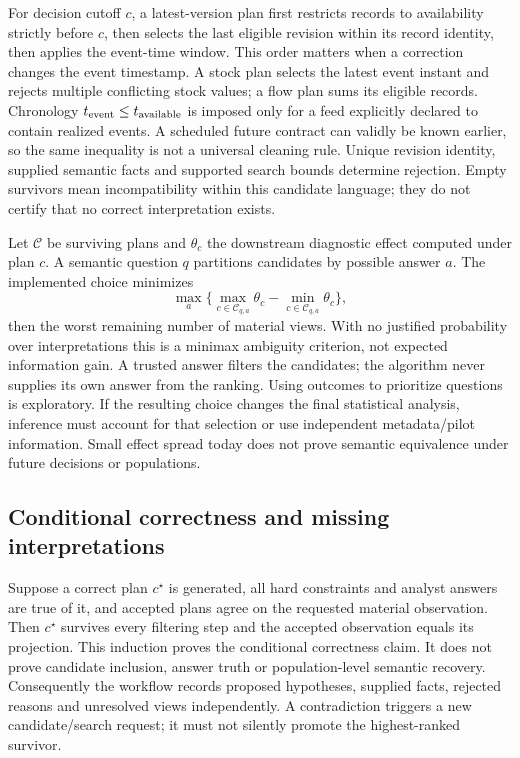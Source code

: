 For decision cutoff $c$, a latest-version plan first restricts records to
availability strictly before $c$, then selects the last eligible revision
within its record identity, then applies the event-time window. This order
matters when a correction changes the event timestamp. A stock plan selects
the latest event instant and rejects multiple conflicting stock values;
a flow plan sums its eligible records. Chronology
$t_{\rm event}\le t_{\rm available}$ is imposed only for a feed explicitly
declared to contain realized events. A scheduled future contract can validly
be known earlier, so the same inequality is not a universal cleaning rule.
Unique revision identity, supplied semantic facts and supported search bounds
determine rejection. Empty survivors mean incompatibility within this
candidate language; they do not certify that no correct interpretation exists.

Let $\mathcal C$ be surviving plans and $\theta_c$ the downstream diagnostic
effect computed under plan $c$. A semantic question $q$ partitions candidates
by possible answer $a$. The implemented choice minimizes
\[
 \max_a\{\max_{c\in\mathcal C_{q,a}}\theta_c-
                 \min_{c\in\mathcal C_{q,a}}\theta_c\},
\]
then the worst remaining number of material views. With no justified
probability over interpretations this is a minimax ambiguity criterion,
not expected information gain. A trusted answer filters the candidates;
the algorithm never supplies its own answer from the ranking. Using outcomes
to prioritize questions is exploratory. If the resulting choice changes
the final statistical analysis, inference must account for that selection
or use independent metadata/pilot information. Small effect spread today
does not prove semantic equivalence under future decisions or populations.

\subsection{Conditional correctness and missing interpretations}
Suppose a correct plan $c^\star$ is generated, all hard constraints and
analyst answers are true of it, and accepted plans agree on the requested
material observation. Then $c^\star$ survives every filtering step and the
accepted observation equals its projection. This induction proves the
conditional correctness claim. It does not prove candidate inclusion,
answer truth or population-level semantic recovery. Consequently the workflow
records proposed hypotheses, supplied facts, rejected reasons and unresolved
views independently. A contradiction triggers a new candidate/search request;
it must not silently promote the highest-ranked survivor.

